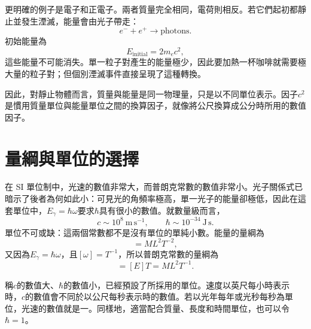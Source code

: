 更明確的例子是電子和正電子。兩者質量完全相同，電荷則相反。若它們起初都靜止並發生湮滅，能量會由光子帶走：
\begin{equation}
e^-+e^+\longrightarrow \text{photons}.
\end{equation}
初始能量為
\begin{equation}
E_{\mathrm{initial}}=2m_e c^2,
\end{equation}
這些能量不可能消失。單一粒子對產生的能量極少，因此要加熱一杯咖啡就需要極大量的粒子對；但個別湮滅事件直接呈現了這種轉換。

因此，對靜止物體而言，質量與能量是同一物理量，只是以不同單位表示。因子\(c^2\)是慣用質量單位與能量單位之間的換算因子，就像將公尺換算成公分時所用的數值因子。

\begin{classroomqa}
\end{classroomqa}

\section{量綱與單位的選擇}

在 SI 單位制中，光速的數值非常大，而普朗克常數的數值非常小。光子關係式已暗示了後者為何如此小：可見光的角頻率極高，單一光子的能量卻極低，因此在這套單位中，\(E_\gamma=\hbar\omega\)要求\(\hbar\)具有很小的數值。就數量級而言，
\begin{equation}
c\sim 10^8\ \mathrm{m\,s^{-1}},
\qquad
\hbar\sim 10^{-34}\ \mathrm{J\,s}.
\end{equation}
單位不可或缺：這兩個常數都不是沒有單位的單純小數。能量的量綱為
\begin{equation}
[E]=M L^2 T^{-2},
\end{equation}
又因為\(E_\gamma=\hbar\omega\)，且\([\omega]=T^{-1}\)，所以普朗克常數的量綱為
\begin{equation}
[\hbar]=[E]T=M L^2 T^{-1}.
\end{equation}

稱\(c\)的數值大、\(\hbar\)的數值小，已經預設了所採用的單位。速度以英尺每小時表示時，\(c\)的數值會不同於以公尺每秒表示時的數值。若以光年每年或光秒每秒為單位，光速的數值就是一。同樣地，適當配合質量、長度和時間單位，也可以令\(\hbar=1\)。

